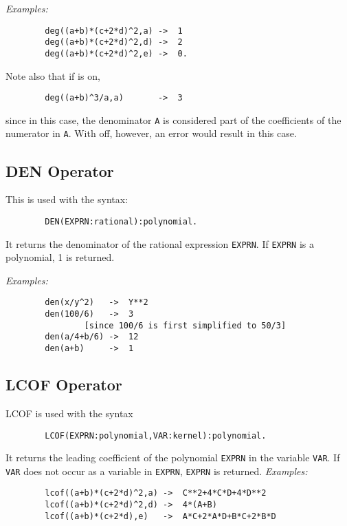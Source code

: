 \textit{Examples:}
\begin{verbatim}
        deg((a+b)*(c+2*d)^2,a) ->  1
        deg((a+b)*(c+2*d)^2,d) ->  2
        deg((a+b)*(c+2*d)^2,e) ->  0.
\end{verbatim}
Note also that if  is on,
\begin{verbatim}
        deg((a+b)^3/a,a)       ->  3
\end{verbatim}
since in this case, the denominator \texttt{A} is considered part of the
coefficients of the numerator in \texttt{A}.  With  off, however,
an error would result in this case.

\subsection{DEN Operator}
\hypertarget{operator:DEN}{}

This is used with the syntax:
\begin{verbatim}
        DEN(EXPRN:rational):polynomial.
\end{verbatim}
It returns the denominator of the rational expression \texttt{EXPRN}.  If
\texttt{EXPRN} is a polynomial, 1 is returned.

\textit{Examples:}
\begin{verbatim}
        den(x/y^2)   ->  Y**2
        den(100/6)   ->  3
                [since 100/6 is first simplified to 50/3]
        den(a/4+b/6) ->  12
        den(a+b)     ->  1
\end{verbatim}

\subsection{LCOF Operator}
\hypertarget{operator:LCOF}{}

LCOF is used with the syntax
\begin{verbatim}
        LCOF(EXPRN:polynomial,VAR:kernel):polynomial.
\end{verbatim}
It returns the leading coefficient of the
polynomial \texttt{EXPRN} in the variable \texttt{VAR}.  If \texttt{VAR} does not
occur as a variable in \texttt{EXPRN}, \texttt{EXPRN} is returned.
\textit{Examples:}
\begin{verbatim}
        lcof((a+b)*(c+2*d)^2,a) ->  C**2+4*C*D+4*D**2
        lcof((a+b)*(c+2*d)^2,d) ->  4*(A+B)
        lcof((a+b)*(c+2*d),e)   ->  A*C+2*A*D+B*C+2*B*D
\end{verbatim}

